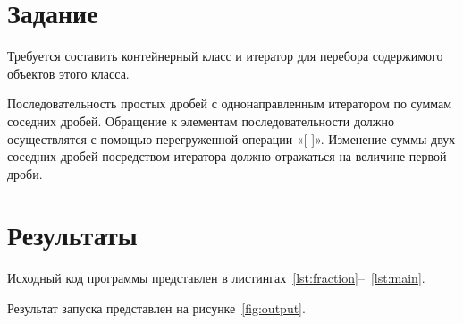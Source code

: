 \documentclass[a4paper, 14pt]{extarticle}
\begin{document}
\renewcommand{\ttdefault}{pcr}

\setlength{\tabcolsep}{3pt}
\newpage
\setcounter{page}{2}

\section{Задание}\label{Sect::task}

Требуется составить контейнерный класс и итератор для перебора содержимого объектов этого
класса.

Последовательность простых дробей с
однонаправленным итератором по суммам
соседних дробей. Обращение к элементам
последовательности должно осуществлятся с
помощью перегруженной операции «[ ]».
Изменение суммы двух соседних дробей
посредством итератора должно отражаться на
величине первой дроби.

\section{Результаты}\label{Sect::res}

Исходный код программы представлен в листингах~\ref{lst:fraction}--~\ref{lst:main}.

Результат запуска представлен на рисунке~\ref{fig:output}.
\end{document}
